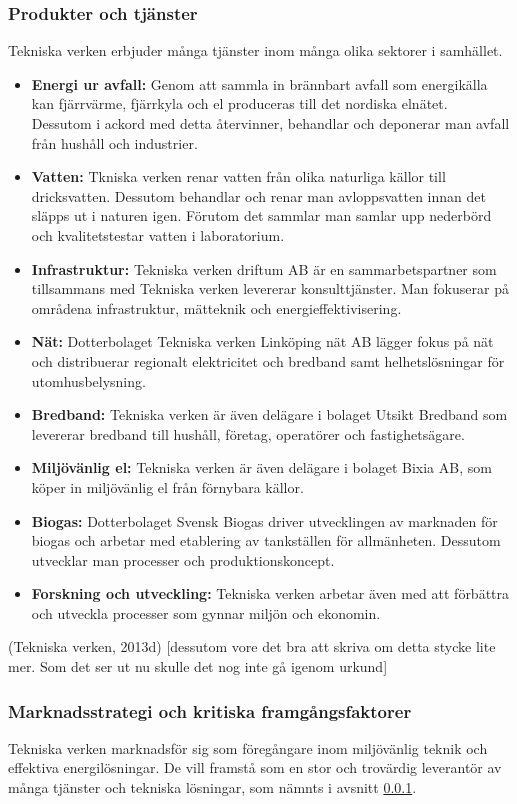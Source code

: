 \documentclass[10pt,a4paper]{article}
\begin{document}
\subsubsection{Produkter och tjänster} \label{subsec:prod}
Tekniska verken erbjuder många tjänster inom många olika sektorer i samhället.
\begin{itemize}
	\item \textbf{Energi ur avfall:} Genom att sammla in brännbart avfall som energikälla kan fjärrvärme, fjärrkyla och el produceras till det nordiska elnätet. Dessutom i ackord med detta återvinner, behandlar och deponerar man avfall från hushåll
	och industrier.
	\item \textbf{Vatten:} Tkniska verken renar vatten från olika naturliga källor till
	dricksvatten. Dessutom behandlar och renar man avloppsvatten innan det släpps ut i naturen igen. Förutom det sammlar man samlar upp nederbörd och kvalitetstestar vatten i laboratorium.
	\item \textbf{Infrastruktur:} Tekniska verken driftum AB är en sammarbetspartner
	som tillsammans med Tekniska verken levererar konsulttjänster. Man fokuserar på områdena infrastruktur,
	mätteknik och energieffektivisering.
	\item \textbf{Nät:} Dotterbolaget Tekniska verken Linköping nät AB lägger fokus på nät och distribuerar regionalt elektricitet och bredband samt
	helhetslösningar för utomhusbelysning.
	\item \textbf{Bredband:} Tekniska verken är även delägare i bolaget Utsikt
	Bredband som levererar bredband till hushåll, företag, operatörer och fastighetsägare.
	\item \textbf{Miljövänlig el:} Tekniska verken är även delägare i bolaget Bixia
	AB, som köper in miljövänlig el från förnybara källor.
	\item \textbf{Biogas:} Dotterbolaget Svensk Biogas driver utvecklingen av
	marknaden för biogas och arbetar med etablering av tankställen för allmänheten.
	Dessutom utvecklar man processer och produktionskoncept.
	\item \textbf{Forskning och utveckling:} Tekniska verken arbetar även med att
	förbättra och utveckla processer som gynnar miljön och ekonomin.
\end{itemize}

(Tekniska verken, 2013d)
[dessutom vore det bra att skriva om detta stycke lite mer. Som det ser ut nu skulle det nog inte gå igenom urkund]

\subsubsection{Marknadsstrategi och kritiska framgångsfaktorer} \label{subsec:kff}
Tekniska verken marknadsför sig som föregångare inom miljövänlig teknik och
effektiva energilösningar. De vill framstå som en stor och trovärdig leverantör 
av många tjänster och tekniska lösningar, som nämnts i avsnitt \ref{subsec:prod}. 
\end{document}
